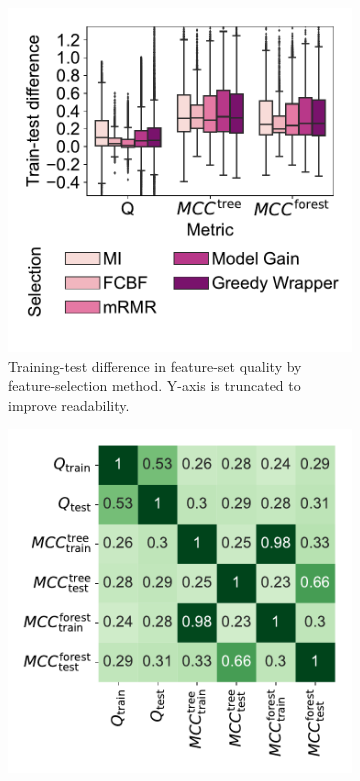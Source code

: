 \documentclass{article}
\theoremstyle{definition}
\begin{document}
\begin{figure}[t]
	\centering
	\begin{subfigure}[t]{0.48\textwidth}
		\centering
		\includegraphics[width=\textwidth, trim=15 15 10 15, clip]{plots/afs-evaluation-metrics-overfitting.pdf}
		\caption{
			Training-test difference in feature-set quality by feature-selection method.
			Y-axis is truncated to improve readability.
		}
		\label{fig:afs:evaluation-metrics-overfitting}
	\end{subfigure}
	\hfill
	\begin{subfigure}[t]{0.48\textwidth}
		\centering
		\includegraphics[width=\textwidth, trim=15 15 10 15, clip]{plots/afs-evaluation-metrics-correlation.pdf}

\end{subfigure}
\end{figure}
\end{document}

